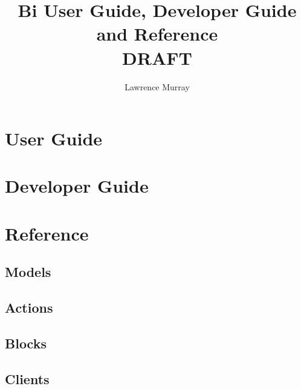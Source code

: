 \documentclass[a4paper,11pt,times]{report}
\title{\Huge{Bi User Guide, Developer Guide and Reference\\DRAFT}}
\author{Lawrence Murray}
\begin{document}
\maketitle

\tableofcontents

\chapter{User Guide\label{User_Guide}}



\chapter{Developer Guide\label{Developer_Guide}}



\chapter{Reference\label{Reference}}

\section{Models}


\section{Actions}


\section{Blocks}


\section{Clients}



\printindex
\end{document}
